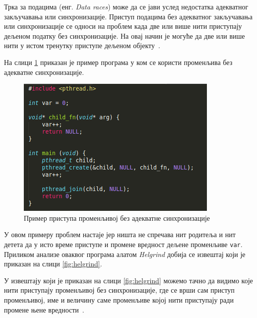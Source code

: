 \documentclass[12pt,oneside]{memoir}
\begin{document}
\indent Трка за подацима (енг. \textit{Data races}) може да се јави услед недостатка адекватног закључавања или синхронизације. Приступ подацима без адекватног закључавања или синхронизације се односи на проблем када две или више нити приступају дељеном податку без синхронизације. На овај начин је могуће да две или више нити у истом тренутку приступе дељеном објекту~\cite{helgrindRef}.

\indent На слици \ref{fig:main4} приказан је пример програма у ком се користи променљива без адекватне синхронизације.

\begin{figure}[h!]
\begin{center}
\includegraphics[scale=0.75]{slika14.png}
\end{center}
\caption{Пример приступа променљивој без адекватне синхронизације}
\label{fig:main4}
\end{figure}


\indent У овом примеру проблем настаје јер ништа не спречава нит родитеља и нит детета да у исто време приступе и промене вредност дељене променљиве \texttt{var}. Приликом анализе оваквог програма алатом \textit{Helgrind} добија се извештај који је приказан на слици \ref{fig:helgrind}.

\indent У извештају који је приказан на слици \ref{fig:helgrind} можемо тачно да видимо које нити приступају променљивој без синхронизације, где се врши сам приступ променљивој, име и величину саме променљиве којој нити приступају ради промене њене вредности~\cite{helgrindRef}.
\end{document}
